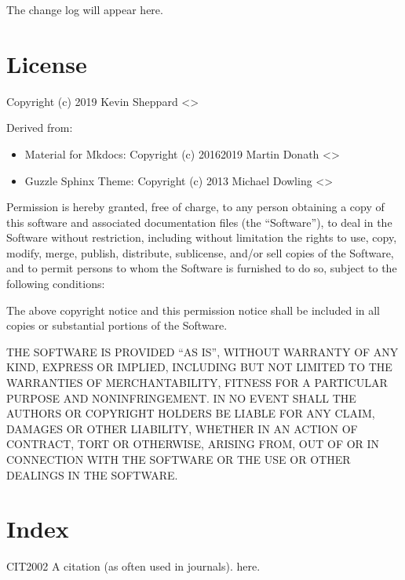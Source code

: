 \documentclass[letterpaper,10pt,english]{sphinxmanual}
\begin{document}
The change log will appear here.


\chapter{License}
\label{\detokenize{license:license}}\label{\detokenize{license::doc}}
Copyright (c) 2019 Kevin Sheppard <>

Derived from:
\begin{itemize}
\item {} 
Material for Mkdocs: Copyright (c) 2016\sphinxhyphen{}2019 Martin Donath <>

\item {} 
Guzzle Sphinx Theme: Copyright (c) 2013 Michael Dowling <>

\end{itemize}

Permission is hereby granted, free of charge, to any person obtaining a copy
of this software and associated documentation files (the “Software”), to deal
in the Software without restriction, including without limitation the rights
to use, copy, modify, merge, publish, distribute, sublicense, and/or sell
copies of the Software, and to permit persons to whom the Software is furnished
to do so, subject to the following conditions:

The above copyright notice and this permission notice shall be included in all
copies or substantial portions of the Software.

THE SOFTWARE IS PROVIDED “AS IS”, WITHOUT WARRANTY OF ANY KIND, EXPRESS OR
IMPLIED, INCLUDING BUT NOT LIMITED TO THE WARRANTIES OF MERCHANTABILITY, FITNESS
FOR A PARTICULAR PURPOSE AND NONINFRINGEMENT. IN NO EVENT SHALL THE AUTHORS OR
COPYRIGHT HOLDERS BE LIABLE FOR ANY CLAIM, DAMAGES OR OTHER LIABILITY, WHETHER
IN AN ACTION OF CONTRACT, TORT OR OTHERWISE, ARISING FROM, OUT OF OR IN CONNECTION
WITH THE SOFTWARE OR THE USE OR OTHER DEALINGS IN THE SOFTWARE.


\chapter{Index}
\label{\detokenize{index:index}}

\begin{sphinxthebibliography}{CIT2002}
A citation
(as often used in journals).
here.
\end{sphinxthebibliography}



\renewcommand{\indexname}{Index}
\footnotesize\raggedright\printindex
\end{document}
